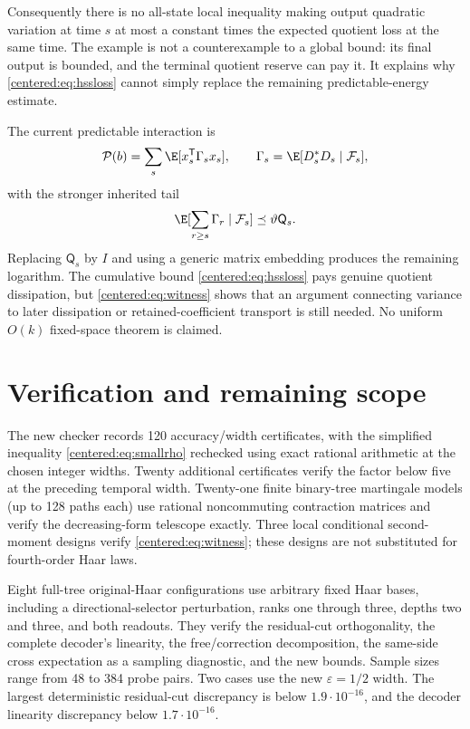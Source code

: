 \documentclass[11pt,oneside,openany,a4paper]{book}
\numberwithin{equation}{chapter}
\theoremstyle{definition}
\theoremstyle{remark}
\begin{document}
Consequently there is no all-state local inequality making output quadratic variation at time $s$ at most a constant times the expected quotient loss at the same time. The example is not a counterexample to a global bound: its final output is bounded, and the terminal quotient reserve can pay it. It explains why \eqref{centered:eq:hssloss} cannot simply replace the remaining predictable-energy estimate.

The current predictable interaction is
\[
 \mathcal P(b)=\sum_s\E[x_s^{\mathsf T}\Gamma_sx_s],\qquad
 \Gamma_s=\E[D_s^*D_s\mid\mathcal F_s],
\]
with the stronger inherited tail
\[
 \E[\sum_{r\ge s}\Gamma_r\mid\mathcal F_s]\preceq\vartheta\mathsf Q_s.
\]
Replacing $\mathsf Q_s$ by $I$ and using a generic matrix embedding produces the remaining logarithm. The cumulative bound \eqref{centered:eq:hssloss} pays genuine quotient dissipation, but \eqref{centered:eq:witness} shows that an argument connecting variance to later dissipation or retained-coefficient transport is still needed. No uniform $O(k)$ fixed-space theorem is claimed.

\section{Verification and remaining scope}
The new checker records 120 accuracy/width certificates, with the simplified inequality \eqref{centered:eq:smallrho} rechecked using exact rational arithmetic at the chosen integer widths. Twenty additional certificates verify the factor below five at the preceding temporal width. Twenty-one finite binary-tree martingale models (up to 128 paths each) use rational noncommuting contraction matrices and verify the decreasing-form telescope exactly. Three local conditional second-moment designs verify \eqref{centered:eq:witness}; these designs are not substituted for fourth-order Haar laws.

Eight full-tree original-Haar configurations use arbitrary fixed Haar bases, including a directional-selector perturbation, ranks one through three, depths two and three, and both readouts. They verify the residual-cut orthogonality, the complete decoder's linearity, the free/correction decomposition, the same-side cross expectation as a sampling diagnostic, and the new bounds. Sample sizes range from 48 to 384 probe pairs. Two cases use the new $\varepsilon=1/2$ width. The largest deterministic residual-cut discrepancy is below $1.9\cdot10^{-16}$, and the decoder linearity discrepancy below $1.7\cdot10^{-16}$.
\end{document}
